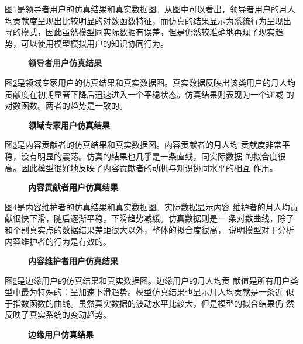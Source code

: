图\ref{fig:simu1}是领导者用户的仿真结果和真实数据图。从图中可以看出，领导者用户的月人
均贡献度呈现出比较明显的对数函数特征，而仿真的结果显示为系统行为呈现出
寻的模式，因此虽然模型同实际数据有误差，但是仍然较准确地再现了现实趋
势，可以使用模型模拟用户的知识协同行为。

\begin{figure}[!htb]
  \centering
 
 \caption{\small{\textbf{领导者用户仿真结果}}}
  \label{fig:simu1}
\end{figure}

图\ref{fig:simu2}是领域专家用户的仿真结果和真实数据图。真实数据反映出该类用户的月人均
贡献度在初期显著下降后迅速进入一个平稳状态。仿真结果则表现为一个递减
的对数函数。两者的趋势是一致的。

\begin{figure}[!htb]
  \centering
  
 \caption{\small{\textbf{领域专家用户仿真结果}}}
  \label{fig:simu2}
\end{figure}

图\ref{fig:simu3}是内容贡献者的仿真结果和真实数据图。内容贡献者的月人均
贡献度非常平稳，没有明显的震荡。仿真的结果也几乎是一条直线，同实际数据
的拟合度很高。因此模型很好地反映了内容贡献者的动机与知识协同水平的相互
作用。

\begin{figure}[!htb]
  \centering
  
  \caption{\small{\textbf{内容贡献者用户仿真结果}}}
  \label{fig:simu3}
\end{figure}

图\ref{fig:simu4}是内容维护者的仿真结果和真实数据图。实际数据显示内容
维护者的月人均贡献很快下滑，随后逐渐平稳，下滑趋势减缓。仿真数据则是一
条对数曲线，除了和个别真实点的数据结果差距很大以外，整体的拟合度很高，
说明模型对于分析内容维护者的行为是有效的。
\begin{figure}[!htb]
  \centering
    
  \caption{\small{\textbf{内容维护者用户仿真结果}}}
  \label{fig:simu4}
\end{figure}

图\ref{fig:simu5}是边缘用户的仿真结果和真实数据图。边缘用户的月人均贡
献值是所有用户类型中最为特殊的：呈加速下滑趋势。模型仿真结果也显示月人均贡献是一条近
似于指数函数的曲线。虽然真实数据的波动水平比较大，但是模型的拟合结果仍
然反映了真实系统的变动趋势。
\begin{figure}[!htb]
  \centering

  \caption{\small{\textbf{边缘用户仿真结果}}}
  \label{fig:simu5}
\end{figure}

